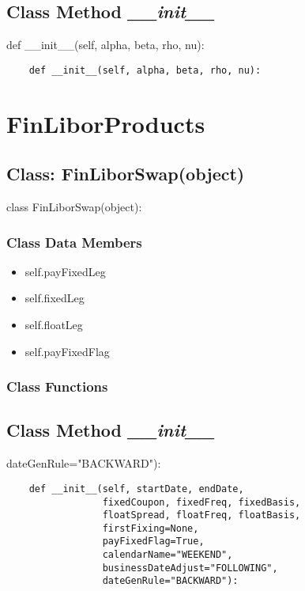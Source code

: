 \documentclass[twoside,11pt]{book}
\begin{document}
\subsection{Class Method {\it \_\_init\_\_}}
def \_\_init\_\_(self, alpha, beta, rho, nu):

\begin{lstlisting}
    def __init__(self, alpha, beta, rho, nu):
\end{lstlisting}

\newpage
\section{FinLiborProducts}

\subsection{Class: FinLiborSwap(object)}
class FinLiborSwap(object):

\subsubsection{Class Data Members}
\begin{itemize}
\item{self.payFixedLeg}
\item{self.fixedLeg}
\item{self.floatLeg}
\item{self.payFixedFlag}
\end{itemize}

\subsubsection{Class Functions}

\subsection{Class Method {\it \_\_init\_\_}}
dateGenRule="BACKWARD"):

\begin{lstlisting}
    def __init__(self, startDate, endDate,
                 fixedCoupon, fixedFreq, fixedBasis,
                 floatSpread, floatFreq, floatBasis,
                 firstFixing=None,
                 payFixedFlag=True,
                 calendarName="WEEKEND",
                 businessDateAdjust="FOLLOWING",
                 dateGenRule="BACKWARD"):
\end{lstlisting}
\end{document}
